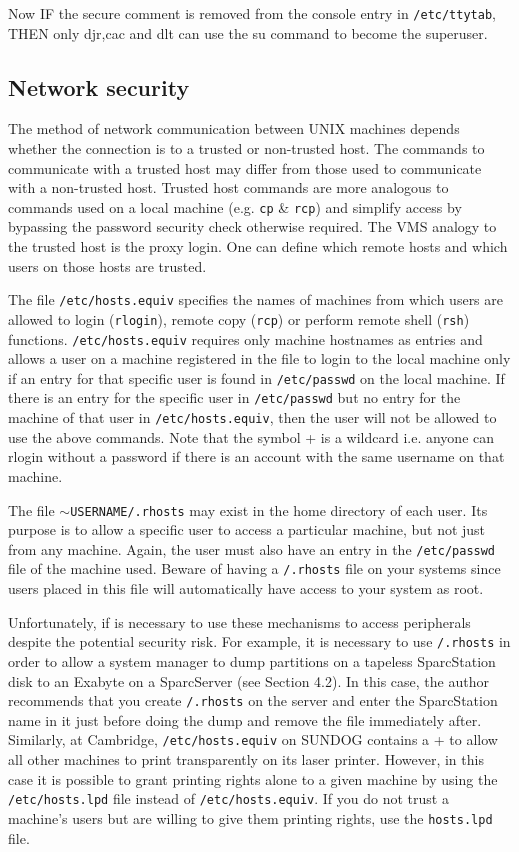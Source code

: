 Now IF the secure comment is removed from the console entry in
{\tt /etc/ttytab},
THEN only djr,cac and dlt can use the su command to become the superuser.

\subsection{Network security}

The method of network communication between UNIX machines depends whether
the connection is to a trusted or non-trusted host. The commands to
communicate with a trusted host may differ from those used to communicate with
a non-trusted host. Trusted host commands are more analogous to commands
used on a local machine (e.g. {\tt cp} \& {\tt rcp}) and simplify access by bypassing the
password security check otherwise required. The VMS analogy to the trusted
host is the proxy login.
One can define which remote hosts and which users on those hosts are trusted.

The file {\tt /etc/hosts.equiv} specifies the names of machines from which users
are allowed to login ({\tt rlogin}), remote copy ({\tt rcp}) or
perform remote shell ({\tt rsh})
functions. {\tt /etc/hosts.equiv} requires only machine hostnames as entries and
allows a user on a machine registered in the file to login to the local machine
only if an entry for that specific user is found in {\tt /etc/passwd} on the
local machine. If there is an entry for the specific user in {\tt /etc/passwd} but no
entry for the machine of that user in {\tt /etc/hosts.equiv}, then the user will
not be allowed to use the above commands.
Note that the symbol + is a wildcard i.e. anyone can rlogin without a password
if there is an account with the same username on that machine.


The file $\sim${\tt USERNAME/.rhosts} may exist in the home directory of each user. Its
purpose is to allow a specific user to access a particular machine, but not
just from any machine. Again, the user must also have an entry in the
{\tt /etc/passwd} file of the machine used. Beware of having  a {\tt /.rhosts} file on your
systems since users placed in this file will automatically have access to
your system as root.



Unfortunately, if is necessary to use these mechanisms to access peripherals
despite the potential security risk. For example,
it is necessary
to use {\tt /.rhosts} in order to allow a system manager to dump partitions
on a tapeless SparcStation disk to an Exabyte on a SparcServer (see
Section 4.2).
In this case, the author  recommends that you create
{\tt /.rhosts} on the server and enter the SparcStation name in it just before doing
the dump and remove the file immediately after.
Similarly, at Cambridge,
{\tt /etc/hosts.equiv} on SUNDOG contains a + to allow all other machines
to print transparently on its laser printer. However, in this case it is
possible to grant printing rights alone to a given machine by using the
{\tt /etc/hosts.lpd} file instead of {\tt /etc/hosts.equiv}. If you do not trust a
machine's users but are willing to give them printing rights, use the
{\tt hosts.lpd}
file.

